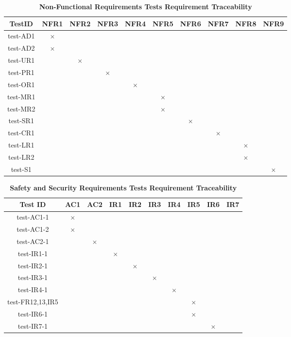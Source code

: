 \documentclass[12pt, titlepage]{article}
\begin{document}
\begin{table} [H]
  \centering
  \begin{tabular}{|c|c|c|c|c|c|c|c|c|c|}
    \hline
    TestID & NFR1 & NFR2 & NFR3 & NFR4 & NFR5 & NFR6 & NFR7 & NFR8 & NFR9 \\
    \hline
    test-AD1 & $\times$ & & & & & & & & \\
    \hline
    test-AD2 &  $\times$ & & & & & & & & \\
    \hline
    test-UR1 & & $\times$ &  & & & & & & \\
    \hline
    test-PR1 & & & $\times$ & & & & & & \\
    \hline
    test-OR1 & & & & $\times$ & & & & &  \\
    \hline
    test-MR1 & & & & & $\times$ & & & &\\
    \hline
    test-MR2 & & & & & $\times$ & & & &  \\
    \hline
    test-SR1 & & & & & & $\times$ & & &\\
    \hline
    test-CR1 & & & & & & & $\times$ & &\\
    \hline
    test-LR1 & & & & & & & & $\times$ &\\
    \hline
    test-LR2 & & & & & & & & $\times$ & \\
    \hline
    test-S1 & & & & & & & & & $\times$ \\
    \hline
  \end{tabular}
\caption{\bf Non-Functional Requirements Tests Requirement Traceability} \label{tab:nfr-test-traceability}
\end{table}

\begin{table} [H]
  \centering
  \begin{tabular}{|c|c|c|c|c|c|c|c|c|c|}
  \hline
  Test ID & AC1 & AC2 & IR1 & IR2 & IR3 & IR4 & IR5 & IR6 & IR7 \\
  \hline
  test-AC1-1 & $\times$ & & & & & & & & \\
  \hline
  test-AC1-2 & $\times$ & & & & & & & & \\
  \hline
  test-AC2-1 & & $\times$ & & & & & & & \\
  \hline
  test-IR1-1 & & & $\times$ & & & & & & \\
  \hline
  test-IR2-1  & & & & $\times$ & & & & &\\
  \hline
  test-IR3-1  & & & & & $\times$ & & & &\\
  \hline
  test-IR4-1  & & & & & & $\times$ & & & \\
  \hline
  test-FR12,13,IR5  & & & & & & & $\times$ & & \\
  \hline
  test-IR6-1  & & & & & & &  $\times$ & & \\
  \hline
  test-IR7-1  & & & & & & & &  $\times$ & \\
  \hline
\end{tabular}
\caption{\bf Safety and Security Requirements Tests Requirement Traceability} \label{tab:sns-test-traceability}
\end{table}
\end{document}
